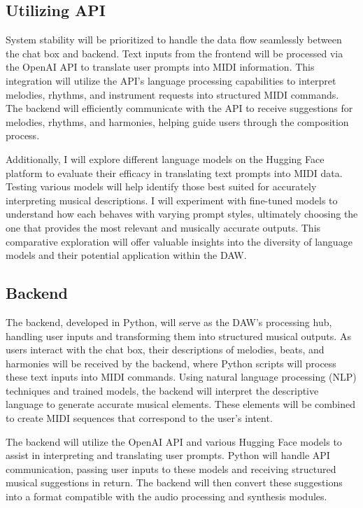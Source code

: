 \documentclass[10pt,twocolumn]{article}
\begin{document}
\subsection{Utilizing API}
System stability will be prioritized to handle the data flow seamlessly between the chat box and backend. Text inputs from the frontend will be processed via the OpenAI API to translate user prompts into MIDI information. This integration will utilize the API's language processing capabilities to interpret melodies, rhythms, and instrument requests into structured MIDI commands. The backend will efficiently communicate with the API to receive suggestions for melodies, rhythms, and harmonies, helping guide users through the composition process.

Additionally, I will explore different language models on the Hugging Face platform to evaluate their efficacy in translating text prompts into MIDI data. Testing various models will help identify those best suited for accurately interpreting musical descriptions. I will experiment with fine-tuned models to understand how each behaves with varying prompt styles, ultimately choosing the one that provides the most relevant and musically accurate outputs. This comparative exploration will offer valuable insights into the diversity of language models and their potential application within the DAW.

\subsection{Backend}
The backend, developed in Python, will serve as the DAW's processing hub, handling user inputs and transforming them into structured musical outputs. As users interact with the chat box, their descriptions of melodies, beats, and harmonies will be received by the backend, where Python scripts will process these text inputs into MIDI commands. Using natural language processing (NLP) techniques and trained models, the backend will interpret the descriptive language to generate accurate musical elements. These elements will be combined to create MIDI sequences that correspond to the user's intent.

The backend will utilize the OpenAI API and various Hugging Face models to assist in interpreting and translating user prompts. Python will handle API communication, passing user inputs to these models and receiving structured musical suggestions in return. The backend will then convert these suggestions into a format compatible with the audio processing and synthesis modules.
\end{document}
